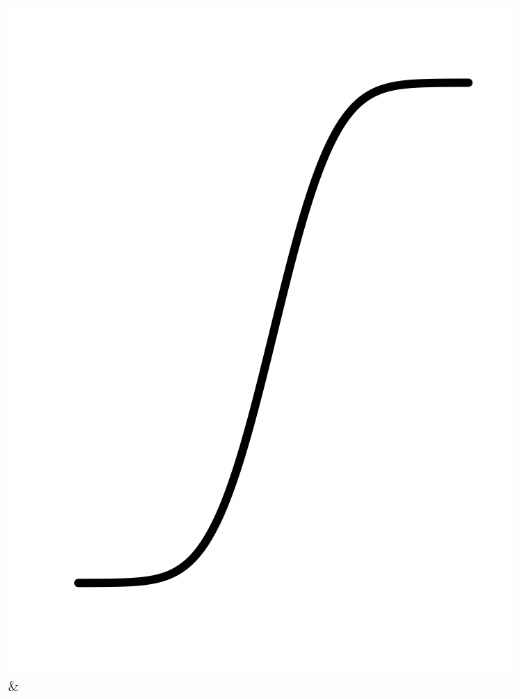 \documentclass[
  letterpaper,
  DIV=11,
  numbers=noendperiod,
  oneside]{article}
\begin{document}
\begin{multicols}{2}
\begin{table}
\begin{minipage}[t]{\linewidth}
{\begin{longtable}[]
\includegraphics{Preliminaries/www/pb-sigmoid.png} &

\end{longtable}}
\end{minipage}
\end{table}
\end{multicols}
\end{document}
